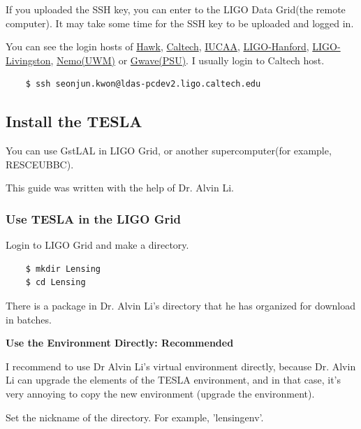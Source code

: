 If you uploaded the SSH key, you can enter to the LIGO Data Grid(the remote computer). It may take some time for the SSH key to be uploaded and logged in.

You can see the login hosts of \href{https://computing.docs.ligo.org/guide/computing-centres/hawk/}{Hawk}, \href{https://computing.docs.ligo.org/guide/computing-centres/cit/}{Caltech}, \href{https://computing.docs.ligo.org/guide/computing-centres/iucaa/}{IUCAA}, \href{https://computing.docs.ligo.org/guide/computing-centres/lho/}{LIGO-Hanford}, \href{https://computing.docs.ligo.org/guide/computing-centres/llo/}{LIGO-Livingston}, \href{https://computing.docs.ligo.org/guide/computing-centres/nemo/}{Nemo(UWM)} or \href{https://computing.docs.ligo.org/guide/computing-centres/psu/}{Gwave(PSU)}. I usually login to Caltech host.

\begin{verbatim}
    $ ssh seonjun.kwon@ldas-pcdev2.ligo.caltech.edu
\end{verbatim}

\subsection{Install the TESLA}

You can use GstLAL in LIGO Grid, or another supercomputer(for example, RESCEUBBC).

This guide was written with the help of Dr. Alvin Li.

\subsubsection{Use TESLA in the LIGO Grid}

Login to LIGO Grid and make a directory.

\begin{verbatim}
    $ mkdir Lensing
    $ cd Lensing
\end{verbatim}

There is a package in Dr. Alvin Li's directory that he has organized for download in batches.

\textbf{Use the Environment Directly: Recommended}

I recommend to use Dr Alvin Li's virtual environment directly, because Dr. Alvin Li can upgrade the elements of the TESLA environment, and in that case, it's very annoying to copy the new environment (upgrade the environment).

Set the nickname of the directory. For example, 'lensingenv'.

